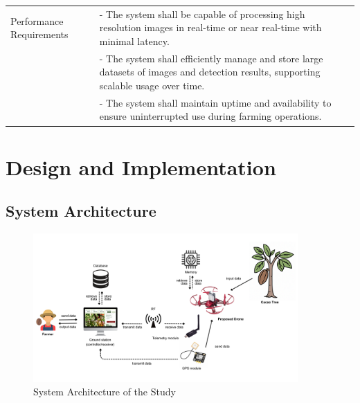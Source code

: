 \begin{longtable}{p{4cm} p{8cm}}
	Performance Requirements & - The system shall be capable of processing high resolution images in real-time or near real-time with minimal latency.                                    \\
	                         & - The system shall efficiently manage and store large datasets of images and detection results, supporting scalable usage over time.                       \\
	                         & - The system shall maintain uptime and availability to ensure uninterrupted use during farming operations.                                                 \\
\end{longtable}

\section*{Design and Implementation}

\subsection*{System Architecture}

\begin{figure}[H]
	\centering
	\caption{System Architecture of the Study}
	\label{fig:SysArch}
	\includegraphics[width=0.9\textwidth]{figures/Sys_Arch.pdf}
\end{figure}

